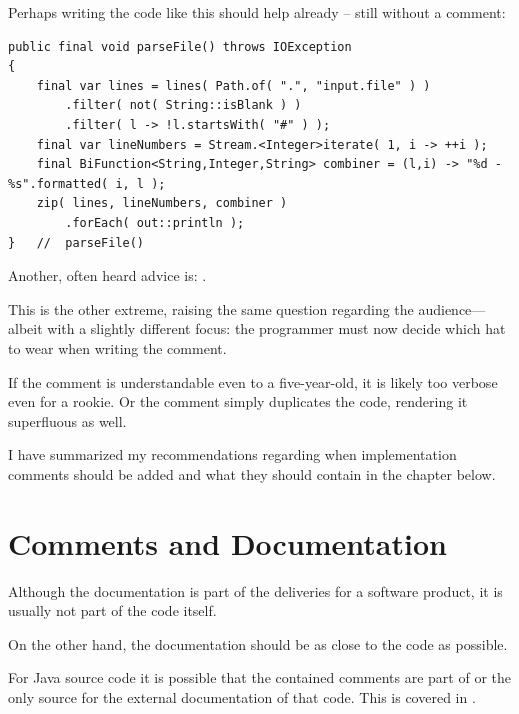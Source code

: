 Perhaps writing the code like this should help already – still without a comment:
\begin{lstlisting}
public final void parseFile() throws IOException
{
    final var lines = lines( Path.of( ".", "input.file" ) )
        .filter( not( String::isBlank ) )
        .filter( l -> !l.startsWith( "#" ) );
    final var lineNumbers = Stream.<Integer>iterate( 1, i -> ++i );
    final BiFunction<String,Integer,String> combiner = (l,i) -> "%d - %s".formatted( i, l );
    zip( lines, lineNumbers, combiner )
        .forEach( out::println );
}   //  parseFile()  
\end{lstlisting}

Another, often heard advice is: .

This is the other extreme, raising the same question regarding the audience—albeit with a slightly different focus: the programmer must now decide which hat to wear when writing the comment.

If the comment is understandable even to a five-year-old, it is likely too verbose even for a rookie. Or the comment simply duplicates the code, rendering it superfluous as well.

I have summarized my recommendations regarding when implementation comments should be added and what they should contain in the chapter  below.

\section{Comments and Documentation}
Although the documentation is part of the deliveries for a software product, it is usually not part of the code itself.

On the other hand, the documentation should be as close to the code as possible.

For Java source code it is possible that the contained comments are part of or the only source for the external documentation of that code. This is covered in .

